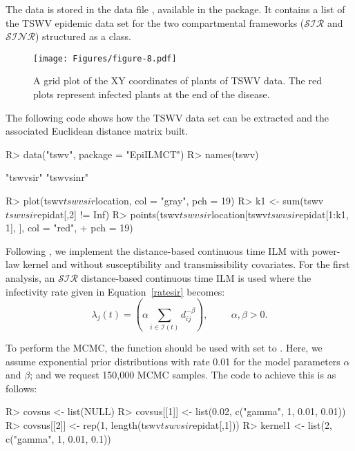 \documentclass[nojss,shortnames]{jss}
\begin{document}
The data is stored in the data file , available in the  package. It contains a list of the TSWV epidemic data set for the two compartmental frameworks ($\mathcal{SIR}$ and $\mathcal{SINR}$) structured as a  class.


\begin{figure}[!h]
\begin{center}
\texttt{[image: Figures/figure-8.pdf]}
\caption{A grid plot of the XY coordinates of plants of TSWV data. The red plots represent infected plants at the end of the disease.}
\label{TSWV}
\end{center}
\end{figure}

The following code shows how the TSWV data set can be extracted and the associated Euclidean distance matrix built. 
\begin{Sinput}
R> data("tswv", package = "EpiILMCT")
R> names(tswv)
\end{Sinput}
\begin{Soutput}
[1] "tswvsir"   "tswvsinr"
\end{Soutput}
\begin{Sinput}
R> plot(tswv$tswvsir$location, col = "gray", pch = 19)
R> k1 <- sum(tswv$tswvsir$epidat[,2] != Inf)
R> points(tswv$tswvsir$location[tswv$tswvsir$epidat[1:k1, 1], ], col = "red", 
+    pch = 19)
\end{Sinput}

Following \citet{pokharel2014supervised,pokharel2016gaussian}, we implement the distance-based continuous time ILM with power-law kernel and without susceptibility and transmissibility covariates. For the first analysis, an $\mathcal{SIR}$ distance-based continuous time ILM is used where the infectivity rate given in Equation~\ref{ratesir} becomes:
\[
\lambda_{j}(t) = \left(\alpha \sum_{i \in \mathcal{I}(t)}{d_{ij}^{-\beta}} \right) , \hspace{1cm} \alpha, \beta>0.
\]

To perform the MCMC, the  function should be used with  set to . Here, we assume exponential prior distributions with rate 0.01 for the model parameters $\alpha$ and $\beta$; and we request 150,000 MCMC samples. The code to achieve this is as follows: 

\begin{Sinput}
R> covsus <- list(NULL)
R> covsus[[1]] <- list(0.02, c("gamma", 1, 0.01, 0.01))
R> covsus[[2]] <- rep(1, length(tswv$tswvsir$epidat[,1]))
R> kernel1 <- list(2, c("gamma", 1, 0.01, 0.1))
\end{Sinput}
\end{document}
